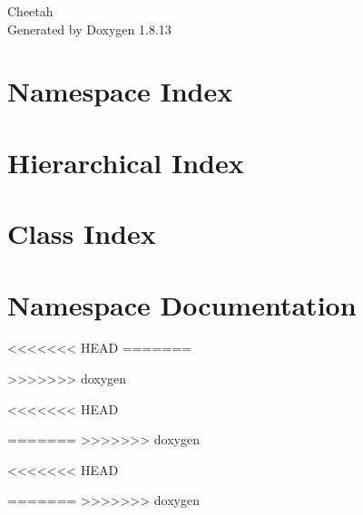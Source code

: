 \documentclass[twoside]{book}
\newcommand{\+}{\discretionary{\mbox{\scriptsize$\hookleftarrow$}}{}{}}
\newcommand{\clearemptydoublepage}{%
  \newpage{\pagestyle{empty}\cleardoublepage}%
}
\begin{document}
\hypersetup{pageanchor=false,
             bookmarksnumbered=true,
             pdfencoding=unicode
            }
\begin{titlepage}
\vspace*{7cm}
\begin{center}%
{\Large Cheetah }\\
\vspace*{1cm}
{\large Generated by Doxygen 1.8.13}\\
\end{center}
\end{titlepage}
\clearemptydoublepage
{}
\tableofcontents
\clearemptydoublepage
{}
\hypersetup{pageanchor=true}

\chapter{Namespace Index}

\chapter{Hierarchical Index}

\chapter{Class Index}

\chapter{Namespace Documentation}

<<<<<<< HEAD
=======

>>>>>>> doxygen





<<<<<<< HEAD

=======
>>>>>>> doxygen





<<<<<<< HEAD

=======
>>>>>>> doxygen


\end{document}
